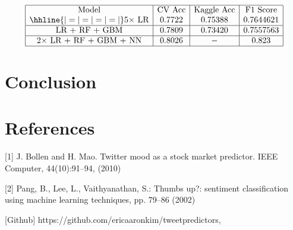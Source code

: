 \documentclass{article}
\begin{document}
$$\begin{array}{|c|c|c|c|}
\hline
\text{Model} & \text{CV Acc} & \text{Kaggle Acc} & \text{F1 Score} \\
\hhline{|=|=|=|=|}
\text{5$\times$ LR} & 0.7722 & 0.75388 & 0.7644621 \\
\hline
\text{LR + RF + GBM} & 0.7809 & 0.73420 & 0.7557563 \\
\hline
\text{$2\times$ LR + RF + GBM + NN} & 0.8026 & - & 0.823 \\
\hline
\end{array}$$


\section{Conclusion}

\newpage

\section{References}
[1] J. Bollen and H. Mao. Twitter mood as a stock market
predictor. IEEE Computer, 44(10):91–94, (2010)

[2] Pang, B., Lee, L., Vaithyanathan, S.: Thumbs up?: sentiment classification using machine
learning techniques, pp. 79–86 (2002)

[Github] https://github.com/ericaaronkim/tweetpredictors, 
\end{document}
